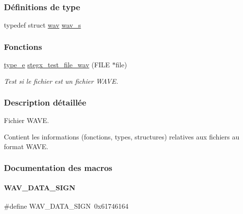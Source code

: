 \subsubsection*{Définitions de type}
\begin{DoxyCompactItemize}
\item 
typedef struct \hyperlink{a00178}{wav} \hyperlink{a00104_ae7804dffa1f86f00af57f8d7bfb9f1e1}{wav\+\_\+s}
\end{DoxyCompactItemize}
\subsubsection*{Fonctions}
\begin{DoxyCompactItemize}
\item 
\hyperlink{a00047_af1ca434cca36ba9fb2a45f6cef3a16d6}{type\+\_\+e} \hyperlink{a00104_ade2af55cc4dbaf47d31e91a4681415f1}{stegx\+\_\+test\+\_\+file\+\_\+wav} (F\+I\+LE $\ast$file)
\begin{DoxyCompactList}\small\item\em Test si le fichier est un fichier W\+A\+VE. \end{DoxyCompactList}\end{DoxyCompactItemize}


\subsubsection{Description détaillée}
Fichier W\+A\+VE. 

Contient les informations (fonctions, types, structures) relatives aux fichiers au format W\+A\+VE. 

\subsubsection{Documentation des macros}
\mbox{\label{a00104_a8b5283f4d6221ba85c05464617bd7a0d}} 
\paragraph{\texorpdfstring{W\+A\+V\+\_\+\+D\+A\+T\+A\+\_\+\+S\+I\+GN}{WAV\_DATA\_SIGN}}
{\footnotesize\ttfamily \#define W\+A\+V\+\_\+\+D\+A\+T\+A\+\_\+\+S\+I\+GN~0x61746164}

